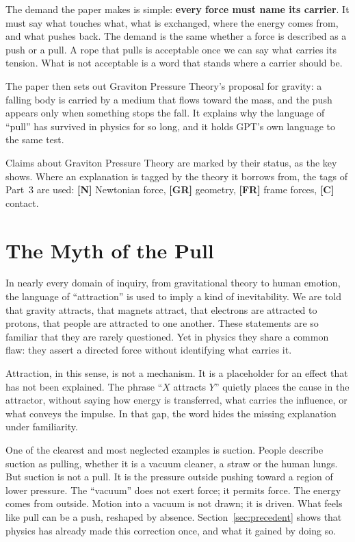 \documentclass[11pt,a4paper]{article}
\newcommand{\reg}[1]{\textsf{\small\textbf{[#1]}}}
\newcommand{\RN}{\reg{N}}
\newcommand{\RGR}{\reg{GR}}
\newcommand{\RFR}{\reg{FR}}
\newcommand{\RC}{\reg{C}}
\begin{document}
The demand the paper makes is simple: \textbf{every force must name its carrier}. It must say what touches what, what is exchanged, where the energy comes from, and what pushes back. The demand is the same whether a force is described as a push or a pull. A rope that pulls is acceptable once we can say what carries its tension. What is not acceptable is a word that stands where a carrier should be.

The paper then sets out Graviton Pressure Theory's proposal for gravity: a falling body is carried by a medium that flows toward the mass, and the push appears only when something stops the fall. It explains why the language of ``pull'' has survived in physics for so long, and it holds GPT's own language to the same test.

Claims about Graviton Pressure Theory are marked by their status, as the key shows. Where an explanation is tagged by the theory it borrows from, the tags of Part~3 are used: \RN{} Newtonian force, \RGR{} geometry, \RFR{} frame forces, \RC{} contact.

\statuskey

\section{The Myth of the Pull}

In nearly every domain of inquiry, from gravitational theory to human emotion, the language of ``attraction'' is used to imply a kind of inevitability. We are told that gravity attracts, that magnets attract, that electrons are attracted to protons, that people are attracted to one another. These statements are so familiar that they are rarely questioned. Yet in physics they share a common flaw: they assert a directed force without identifying what carries it.

Attraction, in this sense, is not a mechanism. It is a placeholder for an effect that has not been explained. The phrase ``$X$ attracts $Y$'' quietly places the cause in the attractor, without saying how energy is transferred, what carries the influence, or what conveys the impulse. In that gap, the word hides the missing explanation under familiarity.

One of the clearest and most neglected examples is suction. People describe suction as pulling, whether it is a vacuum cleaner, a straw or the human lungs. But suction is not a pull. It is the pressure outside pushing toward a region of lower pressure. The ``vacuum'' does not exert force; it permits force. The energy comes from outside. Motion into a vacuum is not drawn; it is driven. What feels like pull can be a push, reshaped by absence. Section~\ref{sec:precedent} shows that physics has already made this correction once, and what it gained by doing so.
\end{document}
